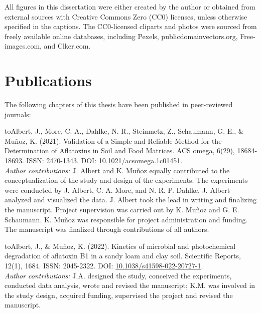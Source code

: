 All figures in this dissertation were either created by the author or obtained from external sources with Creative Commons Zero (CC0) licenses, unless otherwise specified in the captions. The CC0-licensed cliparts and photos were sourced from freely available online databases, including Pexels, publicdomainvectors.org, Free-images.com, and Clker.com.

\section*{Publications}

The following chapters of this thesis have been published in peer-reviewed journals:

{\parindent2cm \hangindent\parindent\noindent\hbox toAlbert, J., More, C. A., Dahlke, N. R., Steinmetz, Z., Schaumann, G. E., \& Muñoz, K. (2021). Validation of a Simple and Reliable Method for the Determination of Aflatoxins in Soil and Food Matrices. ACS omega, 6(29),  18684-18693. ISSN: 2470-1343. DOI: \href{https://pubs.acs.org/doi/10.1021/acsomega.1c01451}{10.1021/acsomega.1c01451}. \\[5pt]
\textit{Author contributions:}  J. Albert and K. Muñoz equally contributed to the conceptualization of the study and design of the experiments. The experiments were conducted by J. Albert, C. A. More, and N. R. P. Dahlke. J. Albert analyzed and visualized the data. J. Albert took the lead in writing and finalizing the manuscript. Project supervision was carried out by K. Muñoz and G. E. Schaumann. K. Muñoz was responsible for project administration and funding. The manuscript was finalized through contributions of all authors. \par} 

{\parindent2cm \hangindent\parindent\noindent\hbox toAlbert, J., \& Muñoz, K. (2022). Kinetics of microbial and photochemical degradation of aflatoxin B1 in a sandy loam and clay soil. Scientific Reports, 12(1), 1684. ISSN: 2045-2322. DOI: \href{https://doi.org/10.1038/s41598-022-20727-1}{10.1038/s41598-022-20727-1}.\\[5pt]
\textit{Author contributions:}  J.A. designed the study, conceived the experiments, conducted data analysis, wrote and revised the manuscript; K.M. was involved in the study design, acquired funding, supervised the project and revised the manuscript. \par}


